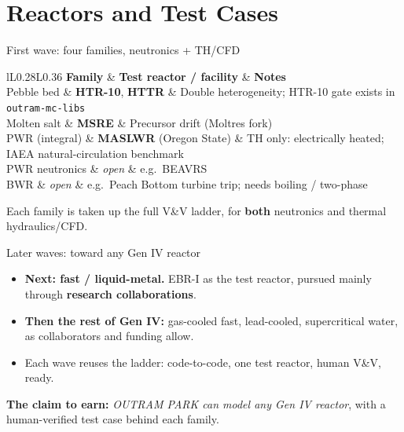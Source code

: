 \documentclass[aspectratio=169]{beamer}
\newcommand{\roadtab}[1]{{\footnotesize\setlength{\tabcolsep}{4pt}#1}}
\begin{document}
\section{Reactors and Test Cases}

\begin{frame}{First wave: four families, neutronics + TH/CFD}
    \roadtab{
    \begin{tabular}{lL{0.28\textwidth}L{0.36\textwidth}}
        \toprule
        \textbf{Family} & \textbf{Test reactor / facility} & \textbf{Notes} \\
        \midrule
        Pebble bed      & \textbf{HTR-10}, \textbf{HTTR} & Double heterogeneity;
                          HTR-10 gate exists in \texttt{outram-mc-libs} \\
        Molten salt     & \textbf{MSRE}   & Precursor drift (Moltres fork) \\
        PWR (integral)  & \textbf{MASLWR} (Oregon State) & TH only: electrically
                          heated; IAEA natural-circulation benchmark \\
        PWR neutronics  & \emph{open} & e.g.\ BEAVRS \\
        BWR             & \emph{open} & e.g.\ Peach Bottom turbine trip; needs
                          boiling / two-phase \\
        \bottomrule
    \end{tabular}}

    \medskip
    \footnotesize
    Each family is taken up the full V\&V ladder, for \textbf{both}
    neutronics and thermal hydraulics/CFD.
\end{frame}

\begin{frame}{Later waves: toward any Gen IV reactor}
    \begin{itemize}
        \item \textbf{Next: fast / liquid-metal.} EBR-I as the test reactor,
              pursued mainly through \textbf{research collaborations}.
        \item \textbf{Then the rest of Gen IV:} gas-cooled fast,
              lead-cooled, supercritical water, as collaborators and
              funding allow.
        \item Each wave reuses the ladder: code-to-code, one test reactor,
              human V\&V, ready.
    \end{itemize}

    \medskip
    \textbf{The claim to earn:} \emph{OUTRAM PARK can model any Gen IV
    reactor}, with a human-verified test case behind each family.
\end{frame}
\end{document}
